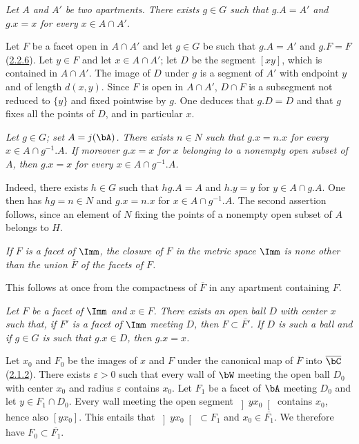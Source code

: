 \documentclass[12pt,a4paper,oneside,english]{smfart}
\makeatletter
\newcommand{\btanchor}[1]{\leavevmode\Hy@raisedlink{\hypertarget{bt:#1}{}}}
\newcommand{\btref}[1]{\hyperlink{bt:#1}{#1}}
\theoremstyle{definition}
\theoremstyle{bt}
\makeatother
\begin{document}
\btanchor{2.5.8}
\emph{Let $A$ and $A'$ be two apartments. There exists $g\in G$ such that
$g.A=A'$ and $g.x=x$ for every $x\in A\cap A'$.}

\medskip
Let $F$ be a facet open in $A\cap A'$ and let $g\in G$ be such that $g.A=A'$
and $g.F=F$ (\btref{2.2.6}). Let $y\in F$ and let $x\in A\cap A'$; let $D$ be the
segment $[xy]$, which is contained in $A\cap A'$. The image of $D$ under $g$
is a segment of $A'$ with endpoint $y$ and of length $d(x,y)$. Since $F$ is
open in $A\cap A'$, $D\cap F$ is a subsegment not reduced to $\{y\}$ and fixed
pointwise by $g$. One deduces that $g.D=D$ and that $g$ fixes all the points
of $D$, and in particular $x$.

\btanchor{2.5.9}
\emph{Let $g\in G$; set $A=j(\bA)$. There exists $n\in N$ such that $g.x=n.x$
for every $x\in A\cap g^{-1}.A$. If moreover $g.x=x$ for $x$ belonging to a
nonempty open subset of $A$, then $g.x=x$ for every $x\in A\cap g^{-1}.A$.}

\medskip
Indeed, there exists $h\in G$ such that $hg.A=A$ and $h.y=y$ for
$y\in A\cap g.A$. One then has $hg=n\in N$ and $g.x=n.x$ for
$x\in A\cap g^{-1}.A$. The second assertion follows, since an element of $N$
fixing the points of a nonempty open subset of $A$ belongs to $H$.

\btanchor{2.5.10}
\emph{If $F$ is a facet of $\Imm$, the closure of $F$ in the metric space
$\Imm$ is none other than the union $\overline{F}$ of the facets of $F$.}

\medskip
This follows at once from the compactness of $\overline{F}$ in any apartment
containing $F$.

\btanchor{2.5.11}
\emph{Let $F$ be a facet of $\Imm$ and $x\in F$. There exists an open ball $D$
with center $x$ such that, if $F'$ is a facet of $\Imm$ meeting $D$, then
$F\subset\overline{F'}$. If $D$ is such a ball and if $g\in G$ is such that
$g.x\in D$, then $g.x=x$.}

\medskip
Let $x_0$ and $F_0$ be the images of $x$ and $F$ under the canonical map of
$\overline{F}$ into $\overline{\bC}$ (\btref{2.1.2}). There exists $\varepsilon>0$
such that every wall of $\bW$ meeting the open ball $D_0$ with center $x_0$
and radius $\varepsilon$ contains $x_0$. Let $F_1$ be a facet of $\bA$ meeting
$D_0$ and let $y\in F_1\cap D_0$. Every wall meeting the open segment
$\left]yx_0\right[$ contains $x_0$, hence also $[yx_0]$. This entails that
$\left]yx_0\right[\,\subset F_1$ and $x_0\in\overline{F_1}$. We therefore have
$F_0\subset\overline{F_1}$.
\end{document}
